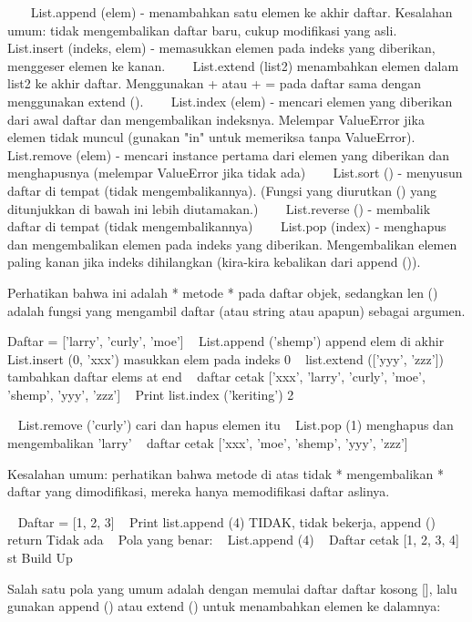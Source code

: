 ~~~ List.append (elem) - menambahkan satu elemen ke akhir daftar. Kesalahan umum: tidak mengembalikan daftar baru, cukup modifikasi yang asli. 
~~~ List.insert (indeks, elem) - memasukkan elemen pada indeks yang diberikan, menggeser elemen ke kanan. 
~~~ List.extend (list2) menambahkan elemen dalam list2 ke akhir daftar. Menggunakan + atau + = pada daftar sama dengan menggunakan extend (). 
~~~ List.index (elem) - mencari elemen yang diberikan dari awal daftar dan mengembalikan indeksnya. Melempar ValueError jika elemen tidak muncul (gunakan "in" untuk memeriksa tanpa ValueError). 
~~~ List.remove (elem) - mencari instance pertama dari elemen yang diberikan dan menghapusnya (melempar ValueError jika tidak ada) 
~~~ List.sort () - menyusun daftar di tempat (tidak mengembalikannya). (Fungsi yang diurutkan () yang ditunjukkan di bawah ini lebih diutamakan.) 
~~~ List.reverse () - membalik daftar di tempat (tidak mengembalikannya) 
~~~ List.pop (index) - menghapus dan mengembalikan elemen pada indeks yang diberikan. Mengembalikan elemen paling kanan jika indeks dihilangkan (kira-kira kebalikan dari append ()). 

Perhatikan bahwa ini adalah * metode * pada daftar objek, sedangkan len () adalah fungsi yang mengambil daftar (atau string atau apapun) sebagai argumen. 


Daftar = ['larry', 'curly', 'moe'] 
~ List.append ('shemp')            append elem di akhir 
~ List.insert (0, 'xxx')            masukkan elem pada indeks 0 
~ list.extend (['yyy', 'zzz'])            tambahkan daftar elems at end 
~ daftar cetak            ['xxx', 'larry', 'curly', 'moe', 'shemp', 'yyy', 'zzz'] 
~ Print list.index ('keriting')            2 

~ List.remove ('curly')            cari dan hapus elemen itu 
~ List.pop (1)            menghapus dan mengembalikan 'larry' 
~ daftar cetak            ['xxx', 'moe', 'shemp', 'yyy', 'zzz'] 

Kesalahan umum: perhatikan bahwa metode di atas tidak * mengembalikan * daftar yang dimodifikasi, mereka hanya memodifikasi daftar aslinya. 

~ Daftar = [1, 2, 3] 
~ Print list.append (4)            TIDAK, tidak bekerja, append () return Tidak ada 
~            Pola yang benar: 
~ List.append (4) 
~ Daftar cetak            [1, 2, 3, 4] 
st Build Up 

Salah satu pola yang umum adalah dengan memulai daftar daftar kosong [], lalu gunakan append () atau extend () untuk menambahkan elemen ke dalamnya: 

